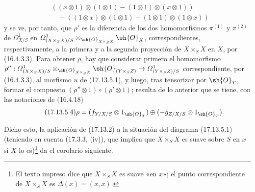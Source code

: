 \begin{env}[17.13.5]
\[\begin{split}
&((x\otimes1)\otimes(1\otimes1)-(1\otimes1)\otimes(x\otimes1))\\
&\quad-((1\otimes x)\otimes(1\otimes1)-(1\otimes1)\otimes(1\otimes x))
\end{split}
\]
y se ve, por tanto, que $\rho'$ es la diferencia de los dos homomorfismos $\pi^{(1)}$ y $\pi^{(2)}$ de $\varOmega^1_{X/S}$ en $\varOmega^1_{(X\times_SX)/S}\otimes_{\sh{O}_{X\times_SX}}\sh{O}_X$, correspondientes, respectivamente, a la primera y a la segunda proyección de $X\times_SX$ en $X$, por (16.4.3.3). Para obtener $\rho$, hay que 
considerar primero el homomorfismo
$\rho'':\varOmega^1_{(X\times_SX)/S}\otimes_{\sh{O}_{X\times_SX}}\sh{O}_{(Y\times_SZ)}\to\varOmega^1_{(Y\times_SZ)/S}$
correspondiente, por (16.4.3.3), al morfismo $u$ de (17.13.5.1), y luego, tras tensorizar por $\sh{O}_T$, formar el compuesto $(\rho''\otimes1)\circ(\rho'\otimes1)$; resulta de lo anterior que se tiene, con las notaciones de (16.4.18)
\[
\label{IV.17.13.5.4}
\tag{17.13.5.4}
\rho=(f_{Y/X/S}\otimes1_{\sh{O}_T})\oplus(-g_{Z/X/S}\otimes1_{\sh{O}_T}).
\]



Dicho esto, la aplicación de (17.13.2) a la situación del diagrama (17.13.5.1) (teniendo en cuenta (17.3.3, (iv)), que implica que $X\times_SX$ es suave sobre $S$ en $x$ si $X$ lo es)\footnote{El texto impreso dice que $X\times_SX$ es suave «en $x$»; el punto correspondiente de $X\times_SX$ es $\Delta(x)=(x,x)$.} da el corolario siguiente.
\end{env}

